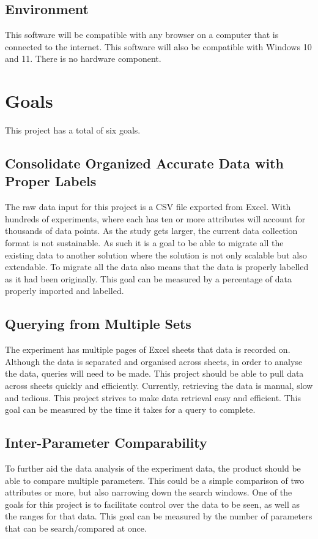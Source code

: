 \documentclass{article}
\begin{document}
\subsection{Environment}
This software will be compatible with any browser on a computer that is
connected to the internet. This software will also be compatible with Windows 10
and 11. There is no hardware component.


\section{Goals}
This project has a total of six goals.
\subsection{Consolidate Organized Accurate Data with Proper Labels}
The raw data input for this project is a CSV file exported from Excel. With
hundreds of experiments, where each has ten or more attributes will account for
thousands of data points. As the study gets larger, the current data collection
format is not sustainable. As such it is a goal to be able to migrate all the
existing data to another solution where the solution is not only scalable but
also extendable. To migrate all the data also means that the data is properly
labelled as it had been originally. This goal can be measured by a percentage of
data properly imported and labelled.

\subsection{Querying from Multiple Sets}
The experiment has multiple pages of Excel sheets that data is recorded on.
Although the data is separated and organised across sheets, in order to analyse
the data, queries will need to be made. This project should be able to pull data
across sheets quickly and efficiently. Currently, retrieving the data is manual,
slow and tedious. This project strives to make data retrieval easy and
efficient. This goal can be measured by the time it takes for a query to
complete.  

\subsection{Inter-Parameter Comparability}
To further aid the data analysis of the experiment data, the product should be
able to compare multiple parameters. This could be a simple comparison of two
attributes or more, but also narrowing down the search windows.  One of the
goals for this project is to facilitate control over the data to be seen, as
well as the ranges for that data. This goal can be measured by the number of
parameters that can be search/compared at once.
\end{document}
